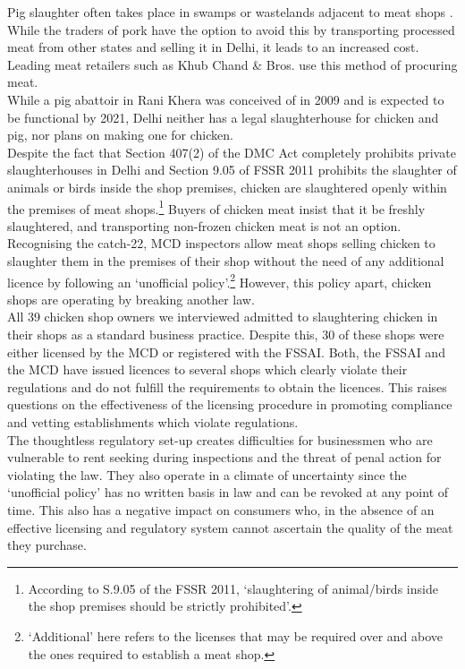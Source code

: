 \documentclass[a4paper, 12pt]{article}
\begin{document}
Pig slaughter often takes place in swamps or wastelands adjacent to meat shops \parencite{tnnnews}. While the traders of pork have the option to avoid this by transporting processed meat from other states and selling it in Delhi, it leads to an increased cost. Leading meat retailers such as Khub Chand \& Bros. use this method of procuring meat.\\

While a pig abattoir in Rani Khera was conceived of in 2009 and is expected to be functional by 2021, Delhi neither has a legal slaughterhouse for chicken and pig, nor plans on making one for chicken. \\

Despite the fact that Section 407(2) of the DMC Act completely prohibits private slaughterhouses in Delhi and Section 9.05 of FSSR 2011 prohibits the slaughter of animals or birds inside the shop premises, chicken are slaughtered openly within the premises of meat shops.\footnote{According to S.9.05 of the FSSR 2011, ‘slaughtering of animal/birds inside the shop premises should be strictly prohibited’.} Buyers of chicken meat insist that it be freshly slaughtered, and transporting non-frozen chicken meat is not an option.\\

Recognising the catch-22, MCD inspectors allow meat shops selling chicken to slaughter them in the premises of their shop without the need of any additional licence by following an ‘unofficial policy’.\footnote{‘Additional’ here refers to the licenses that may be required over and above the ones required to establish a meat shop.} However, this policy apart, chicken shops are operating by breaking another law. \\

All 39 chicken shop owners we interviewed admitted to slaughtering chicken in their shops as a standard business practice. Despite this, 30 of these shops were either licensed by the MCD or registered with the FSSAI. Both, the FSSAI and the MCD have issued licences to several shops which clearly violate their regulations and do not fulfill the requirements to obtain the licences. This raises questions on the effectiveness of the licensing procedure in promoting compliance and vetting establishments which violate regulations. \\

The thoughtless regulatory set-up creates difficulties for businessmen who are vulnerable to rent seeking during inspections and the threat of penal action for violating the law. They also operate in a climate of uncertainty since the ‘unofficial policy’ has no written basis in law and can be revoked at any point of time. This also has a negative impact on consumers who, in the absence of an effective licensing and regulatory system cannot ascertain the quality of the meat they purchase. \\
\end{document}
